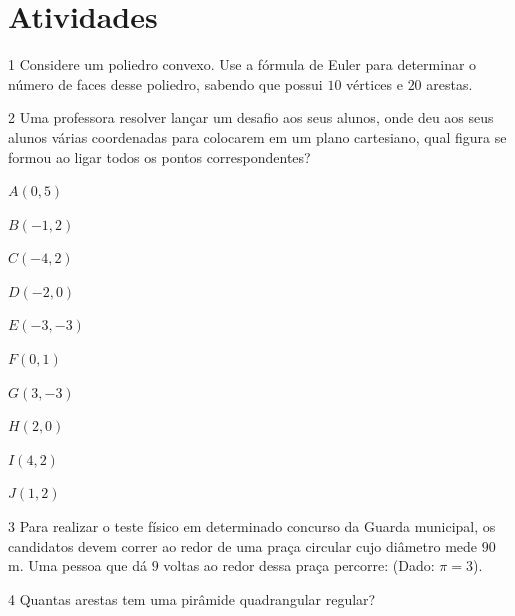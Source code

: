 \section{Atividades}

\num{1}  Considere um poliedro convexo. Use a fórmula de Euler para determinar
o número de faces desse poliedro, sabendo que possui $10$ vértices e $20$
arestas.


\num{2}  Uma professora resolver lançar um desafio aos seus alunos, onde deu
aos seus alunos várias coordenadas para colocarem em um plano
cartesiano, qual figura se formou ao ligar todos os pontos
correspondentes?

\begin{escolha}
\item $A (0,5)$
\item $B (-1,2)$
\item $C (-4,2)$
\item $D (-2,0)$
\item $E (-3,-3)$
\item $F (0,1)$
\item $G (3,-3)$
\item $H (2,0)$
\item $I (4,2)$
\item $J (1,2)$
\end{escolha}



\num{3}  Para realizar o teste físico em determinado concurso da Guarda
municipal, os candidatos devem correr ao redor de uma praça circular
cujo diâmetro mede $90$ m. Uma pessoa que dá $9$ voltas ao redor dessa praça
percorre: (Dado: $π = 3$).


\num{4}  Quantas arestas tem uma pirâmide quadrangular regular?


